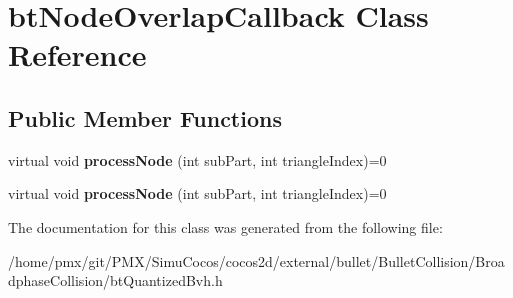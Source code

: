 \hypertarget{classbtNodeOverlapCallback}{}\section{bt\+Node\+Overlap\+Callback Class Reference}
\label{classbtNodeOverlapCallback}
\subsection*{Public Member Functions}
\begin{DoxyCompactItemize}
\item 
\mbox{\label{classbtNodeOverlapCallback_aaad327d468e3ce197c133367ec15baf1}} 
virtual void {\bfseries process\+Node} (int sub\+Part, int triangle\+Index)=0
\item 
\mbox{\label{classbtNodeOverlapCallback_aaad327d468e3ce197c133367ec15baf1}} 
virtual void {\bfseries process\+Node} (int sub\+Part, int triangle\+Index)=0
\end{DoxyCompactItemize}


The documentation for this class was generated from the following file\+:\begin{DoxyCompactItemize}
\item 
/home/pmx/git/\+P\+M\+X/\+Simu\+Cocos/cocos2d/external/bullet/\+Bullet\+Collision/\+Broadphase\+Collision/bt\+Quantized\+Bvh.\+h\end{DoxyCompactItemize}
